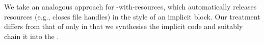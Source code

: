 We take an analogous approach for -with-resources, which
automatically releases resources (e.g., closes file handles) in the
style of an implicit  block.  Our treatment differs from
that of  only in that we synthesise the implicit
code and suitably chain it into the {\CFG}.


%	        





